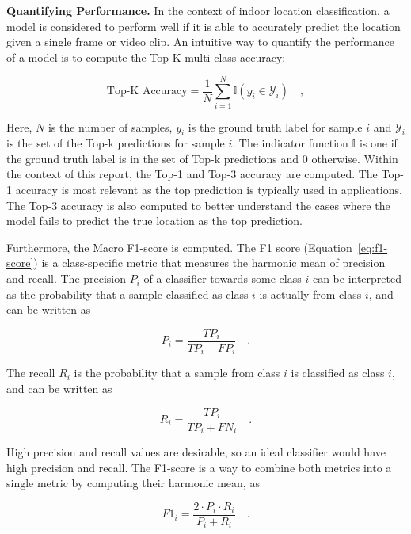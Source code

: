 \documentclass[a4paper]{article}
\begin{document}
\textbf{Quantifying Performance.} In the context of indoor location
classification, a model is considered to perform well if it is able to
accurately predict the location given a single frame or video clip. An intuitive
way to quantify the performance of a model is to compute the Top-K multi-class
accuracy:

\begin{equation}
  \text{Top-K Accuracy} = \frac{1}{N} \sum_{i=1}^{N} \mathbb{I}(y_i \in
  \mathcal{Y}_i) \quad ,
  \label{eq:top-k-accuracy}
\end{equation}

Here, $N$ is the number of samples, $y_i$ is the ground truth label for sample
$i$ and $\mathcal{Y}_i$ is the set of the Top-k predictions for sample $i$. The
indicator function $\mathbb{I}$ is one if the ground truth label is in the set
of Top-k predictions and 0 otherwise. Within the context of this report, the
Top-1 and Top-3 accuracy are computed. The Top-1 accuracy is most relevant as
the top prediction is typically used in applications. The Top-3 accuracy is also
computed to better understand the cases where the model fails to predict the
true location as the top prediction.


Furthermore, the Macro F1-score is computed. The F1 score
(Equation~\ref{eq:f1-score}) is a class-specific metric that measures the
harmonic mean of precision and recall. The precision $P_i$ of a classifier
towards some class $i$ can be interpreted as the probability that a sample
classified as class $i$ is actually from class $i$, and can be written as

\begin{equation}
  P_i = \frac{TP_i}{TP_i + FP_i} \quad.
  \label{eq:precision}
\end{equation}

The recall $R_i$ is the probability that a sample from class $i$ is classified
as class $i$, and can be written as

\begin{equation}
  R_i = \frac{TP_i}{TP_i + FN_i} \quad.
  \label{eq:recall}
\end{equation}

High precision and recall values are desirable, so an ideal classifier would
have high precision and recall. The F1-score is a way to combine both metrics
into a single metric by computing their harmonic mean, as

\begin{equation}
  F1_i = \frac{2 \cdot P_i \cdot R_i}{P_i + R_i} \quad .
  \label{eq:f1-score}
\end{equation}
\end{document}
